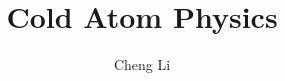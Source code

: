 \documentclass[letterpaper,11pt]{book}
\begin{document}
\title{Cold Atom Physics}
\author{Cheng Li}
\date{}
\maketitle







\end{document}
